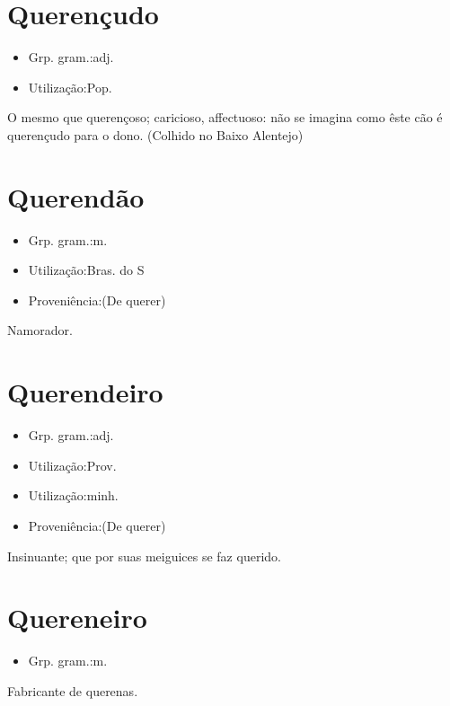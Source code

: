 \section{Querençudo}
\begin{itemize}
\item {Grp. gram.:adj.}
\end{itemize}
\begin{itemize}
\item {Utilização:Pop.}
\end{itemize}
O mesmo que \textunderscore querençoso\textunderscore ; caricioso, affectuoso: \textunderscore não se imagina como êste cão é querençudo para o dono\textunderscore . (Colhido no Baixo Alentejo)
\section{Querendão}
\begin{itemize}
\item {Grp. gram.:m.}
\end{itemize}
\begin{itemize}
\item {Utilização:Bras. do S}
\end{itemize}
\begin{itemize}
\item {Proveniência:(De \textunderscore querer\textunderscore )}
\end{itemize}
Namorador.
\section{Querendeiro}
\begin{itemize}
\item {Grp. gram.:adj.}
\end{itemize}
\begin{itemize}
\item {Utilização:Prov.}
\end{itemize}
\begin{itemize}
\item {Utilização:minh.}
\end{itemize}
\begin{itemize}
\item {Proveniência:(De \textunderscore querer\textunderscore )}
\end{itemize}
Insinuante; que por suas meiguices se faz querido.
\section{Quereneiro}
\begin{itemize}
\item {Grp. gram.:m.}
\end{itemize}
Fabricante de querenas.
